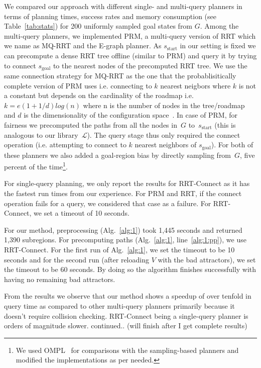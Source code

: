\documentclass[letterpaper]{article} %
\newcommand{\calL}{\ensuremath{\mathcal{L}}\xspace}
\newcommand{\sStart}{\ensuremath{s_{\text{start}}\xspace}}
\newcommand{\sGoal}{\ensuremath{s_{\text{goal}}\xspace}}
\begin{document}
We compared our approach with different single- and multi-query planners in terms of planning times, success rates and memory consumption (see Table~\ref{tab:stats}) for 200 uniformly sampled goal states from $G$. Among the multi-query planners, we implemented \textsf{PRM}, a multi-query version of \textsf{RRT} which we name as MQ-RRT and the E-graph planner. As $\sStart$ in our setting is fixed we can precompute a dense RRT tree offline (similar to PRM) and query it by trying to connect $\sGoal$ to the nearest nodes of the precomputed RRT tree. We use the same connection strategy for MQ-RRT as the one that the probablisitically complete version of PRM uses i.e. connecting to $k$ nearest neigbors where $k$ is not a constant but depends on the cardinality of the roadmap i.e. $k = e(1+1/d)log(n)$ where n is the number of nodes in the tree/roadmap and $d$ is the dimensionality of the configuration space~\cite{karaman2011sampling}. 
In case of \textsf{PRM}, for fairness we precomputed the paths from all the nodes in~$G$ to~$s_{\text{start}}$ (this is analogous to our library~$\calL$). 
The query stage thus only required the connect operation (i.e. attempting to connect to $k$ nearest neighbors of $\sGoal$). For both of these planners we also added a goal-region bias by directly sampling from~$G$, five percent of the time\footnote{We used OMPL~\cite{SMK12} for comparisons with the sampling-based planners and modified the implementations as per needed.}. 

For single-query planning, we only report the results for \textsf{RRT}-Connect as it has the fastest run times from our experience. For \textsf{PRM} and \textsf{RRT}, if the connect operation fails for a query, we considered that case as a failure. For \textsf{RRT}-Connect, we set a timeout of 10 seconds.

For our method, preprocessing (Alg.~\ref{alg:1}) took 1,445 seconds and returned 1,390 subregions. For precomputing paths (Alg.~\ref{alg:1}, line~\ref{alg:1:pp}), we use \textsf{RRT}-Connect. For the first run of Alg.~\ref{alg:1}, we set the timeout to be 10 seconds and for the second run (after reloading $V$ with the bad attractors), we set the timeout to be 60 seconds. By doing so the algorithm finishes successfully with having no remaining bad attractors.

From the results we observe that our method shows a speedup of over tenfold in query time as compared to other multi-query planners primarily because it doesn't require collision checking. RRT-Connect being a single-query planner is orders of magnitude slower. {\color{blue} continued.. (will finish after I get complete results)}
\end{document}
